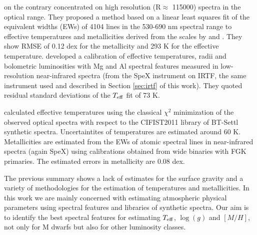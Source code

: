 \cite{2014A&A...568A.121N} on the contrary concentrated on
high resolution (R$\approx$ 115000) spectra in the optical range.
They proposed a method based on a linear least squares fit of the
equivalent widths (EWs) of 4104 lines in the 530-690 nm spectral range
to effective temperatures and metallicities derived from the scales
by \cite{2012A&A...538A..25N} and \cite{2008MNRAS.389..585C}.  They
show RMSE of 0.12 dex for the metallicity and 293 K for the effective
temperature. \cite{2015ApJ...800...85N} developed a calibration of
effective temperatures, radii and bolometric luminosities with Mg and
Al spectral features measured in low-resolution near-infrared spectra
(from the SpeX instrument on IRTF, the same instrument used and
described in Section \ref{sec:irtf} of this work).  They quoted 
residual standard deviations of the $T_{\rm eff}$ fit of 73
K.

\cite{Mann2015} calculated effective temperatures using the
classical $\chi^2$ minimization of the observed optical spectra with
respect to the CIFIST2011 library of BT-Settl synthetic spectra.
Uncertaintites of temperatures are estimated around 60 K.
Metallicities are estimated from the EWs of atomic spectral lines in
near-infrared spectra (again SpeX) using calibrations obtained from
wide binaries with FGK primaries. The estimated errors in metallicity
are 0.08 dex.

The previous summary shows a lack of estimates for the surface gravity
and a variety of methodologies for the estimation of temperatures and
metallicities. In this work we are mainly concerned with estimating
atmospheric physical parameters using spectral features and libraries
of synthetic spectra. Our aim is to identify the best spectral
features for estimating $T_{\rm eff}$, $\log(g)$ and $[M/H]$, not
only for M dwarfs but also for other luminosity classes.

